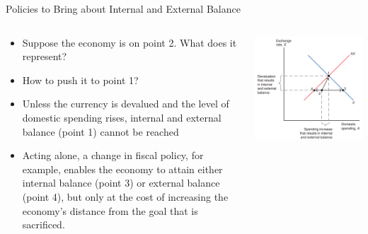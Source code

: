 \documentclass[10pt,hyperref={CJKbookmarks=true},xcolor=dvipsnames,aspectratio=169]{beamer}
\begin{document}
\begin{frame}{Policies to Bring about Internal and External Balance}

\begin{columns}[onlytextwidth]
	\begin{column}{0.5\textwidth}
		\begin{itemize}			
			\item Suppose the economy is on point 2. What does it represent?
				
			\item How to push it to point 1?
			 
			\item Unless the currency is devalued and			the level of domestic spending rises,			internal and external balance (point 1)			cannot be reached
			\item Acting alone,
			a change in fiscal policy, for example,
			enables the economy to attain either
			internal balance (point 3) or external
			balance (point 4), but only at the cost
			of increasing the economy’s distance
			from the goal that is sacrificed.
		\end{itemize}
	\end{column}
	\begin{column}{0.5\textwidth}
		\centering
		\includegraphics[scale=0.45]{fig/systems/balance2}
	\end{column}
\end{columns}
\end{frame}
\end{document}
